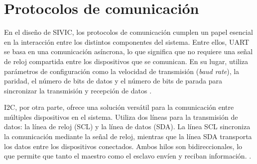 \section{Protocolos de comunicación}

En el diseño de SIVIC, los protocolos de comunicación cumplen un papel esencial en la interacción entre los distintos componentes del sistema. Entre ellos, UART se basa en una comunicación asíncrona, lo que significa que no requiere una señal de reloj compartida entre los dispositivos que se comunican. En su lugar, utiliza parámetros de configuración como la velocidad de transmisión (\textit{baud rate}), la paridad, el número de bits de datos y el número de bits de parada para sincronizar la transmisión y recepción de datos \citep{WEBSITE:uart}.

I2C, por otra parte, ofrece una solución versátil para la comunicación entre múltiples dispositivos en el sistema. Utiliza dos líneas para la transmisión de datos: la línea de reloj (SCL) y la línea de datos (SDA). La línea SCL sincroniza la comunicación mediante la señal de reloj, mientras que la línea SDA transporta los datos entre los dispositivos conectados. Ambos hilos son bidireccionales, lo que permite que tanto el maestro como el esclavo envíen y reciban información. \citep{WEBSITE:i2c}.
